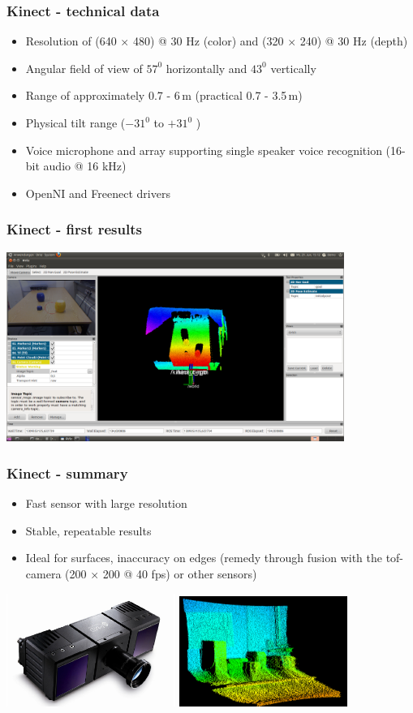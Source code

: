 \begin{frame}
 \frametitle{Kinect - technical data}
\begin{itemize}
  \item Resolution of (640 $\times$ 480) @ 30 Hz (color) and (320 $\times$ 240) @ 30 Hz (depth)
  \item Angular field of view of $57^0$ horizontally and $43^0$ vertically
  \item Range of approximately 0.7 - 6\,m (practical 0.7 - 3.5\,m)
  \item Physical tilt range ($-31^0$  to $+31^0$ )
  \item Voice microphone and array supporting single speaker voice recognition (16-bit audio @ 16 kHz)
  \item OpenNI and Freenect drivers
\end{itemize}

\end{frame}


\begin{frame} 
 \frametitle{Kinect - first results}
\includegraphics[width=11cm]{img/ros_rviz.png}
\end{frame}


\begin{frame}
 \frametitle{Kinect - summary}
\begin{itemize}
  \item Fast sensor with large resolution
  \item Stable, repeatable results
  \item Ideal for surfaces, inaccuracy on edges (remedy through fusion with the tof-camera (200 $\times$ 200 @ 40 fps) or other sensors)
\end{itemize}
\hspace{3ex}\includegraphics[width=5.5cm]{img/camcube.png}
\includegraphics[width=5.5cm]{img/pmd2.png}
\end{frame}

